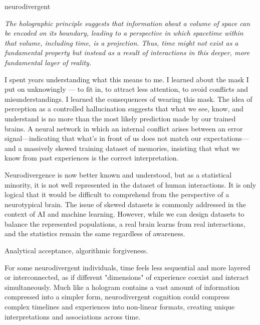 



\begin{center}
\vspace*{\fill}
\Huge{neurodivergent}

\vspace{2cm}

\begin{flushright}
\large{
\textit{The holographic principle suggests that information about a volume of space can be encoded on its boundary, leading to a perspective in which spacetime within that volume, including time, is a projection. Thus, time might not exist as a fundamental property but instead as a result of interactions in this deeper, more fundamental layer of reality.}}
\end{flushright}

\vspace*{\fill}
\end{center}

I spent years understanding what this means to me. I learned about the mask I put on unknowingly — to fit in, to attract less attention, to avoid conflicts and misunderstandings. I learned the consequences of wearing this mask. The idea of perception as a controlled hallucination suggests that what we see, know, and understand is no more than the most likely prediction made by our trained brains. A neural network in which an internal conflict arises between an error signal—indicating that what’s in front of us does not match our expectations—and a massively skewed training dataset of memories, insisting that what we know from past experiences is the correct interpretation.

Neurodivergence is now better known and understood, but as a statistical minority, it is not well represented in the dataset of human interactions. It is only logical that it would be difficult to comprehend from the perspective of a neurotypical brain. The issue of skewed datasets is commonly addressed in the context of AI and machine learning. However, while we can design datasets to balance the represented populations, a real brain learns from real interactions, and the statistics remain the same regardless of awareness.

Analytical acceptance, algorithmic forgiveness.

For some neurodivergent individuals, time feels less sequential and more layered or interconnected, as if different "dimensions" of experience coexist and interact simultaneously. Much like a hologram contains a vast amount of information compressed into a simpler form, neurodivergent cognition could compress complex timelines and experiences into non-linear formats, creating unique interpretations and associations across time.
